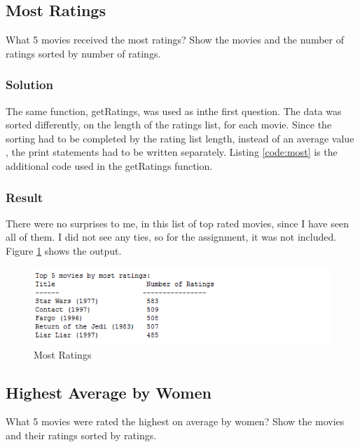 \documentclass[paper=a4, fontsize=11pt]{scrartcl} %
\numberwithin{equation}{section} %
\numberwithin{figure}{section} %
\numberwithin{table}{section} %
\begin{document}

\subsection{Most Ratings}
What 5 movies received the most ratings?
 Show the movies and the number of ratings sorted by number of ratings.

\subsubsection{Solution}
The same function, getRatings, was used as inthe first question.  
The data was sorted differently, on the length of the ratings list, for each movie.
Since the sorting had to be completed by the rating list length, instead of an average value , the print statements had to be written separately.
Listing \ref{code:most} is the additional code used in the getRatings function.\\



\subsubsection{Result}
There were no surprises to me, in this list of top rated movies, since I have seen all of them.
I did not see any ties, so for the assignment, it was not included.
Figure \ref{fig:most} shows the output.

\begin{figure}[H]
\includegraphics[width=1\textwidth]{pics/mostRatings}
\caption{Most Ratings}
\label{fig:most}
\end{figure}


\subsection{Highest Average by Women}
What 5 movies were rated the highest on average by women?
Show the movies and their ratings sorted by ratings.
\end{document}
